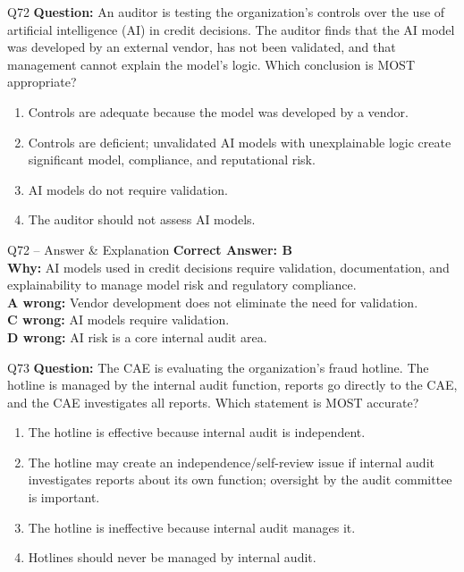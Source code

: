 \documentclass[aspectratio=169,10pt]{beamer}
\begin{document}
	\begin{frame}[t]{Q72}
		\small
		\textbf{Question:} An auditor is testing the organization's controls over the use of artificial intelligence (AI) in credit decisions. The auditor finds that the AI model was developed by an external vendor, has not been validated, and that management cannot explain the model's logic. Which conclusion is MOST appropriate?
		\begin{enumerate}[label=\Alph*.,itemsep=1pt,topsep=2pt]
			\item Controls are adequate because the model was developed by a vendor.
			\item Controls are deficient; unvalidated AI models with unexplainable logic create significant model, compliance, and reputational risk.
			\item AI models do not require validation.
			\item The auditor should not assess AI models.
		\end{enumerate}
	\end{frame}
	
	\begin{frame}[t]{Q72 -- Answer \& Explanation}
		\small
		\textbf{Correct Answer: B} \\[4pt]
		\textbf{Why:} AI models used in credit decisions require validation, documentation, and explainability to manage model risk and regulatory compliance. \\[4pt]
		\textbf{A wrong:} Vendor development does not eliminate the need for validation. \\[2pt]
		\textbf{C wrong:} AI models require validation. \\[2pt]
		\textbf{D wrong:} AI risk is a core internal audit area.
	\end{frame}
	
	\begin{frame}[t]{Q73}
		\small
		\textbf{Question:} The CAE is evaluating the organization's fraud hotline. The hotline is managed by the internal audit function, reports go directly to the CAE, and the CAE investigates all reports. Which statement is MOST accurate?
		\begin{enumerate}[label=\Alph*.,itemsep=1pt,topsep=2pt]
			\item The hotline is effective because internal audit is independent.
			\item The hotline may create an independence/self-review issue if internal audit investigates reports about its own function; oversight by the audit committee is important.
			\item The hotline is ineffective because internal audit manages it.
			\item Hotlines should never be managed by internal audit.
		\end{enumerate}
	\end{frame}
	
\end{document}
